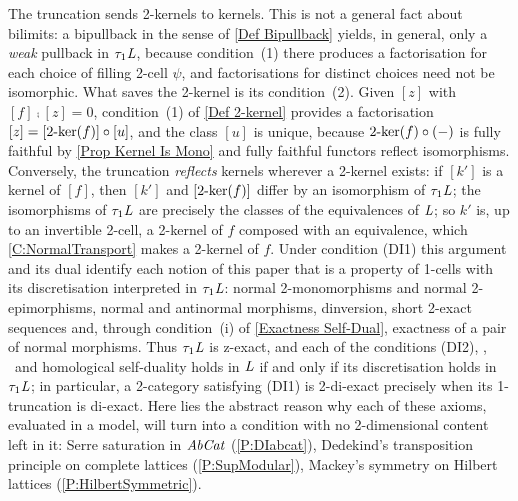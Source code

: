 \begin{remark}
	The truncation sends 2-kernels to kernels. This is not a general fact about bilimits: a bipullback in the sense of \ref{Def Bipullback} yields, in general, only a \emph{weak} pullback in \(\tau_{1}\mathit{L}\), because condition~(1) there produces a factorisation for each choice of filling 2-cell \(\psi\), and factorisations for distinct choices need not be isomorphic. What saves the 2-kernel is its condition~(2). Given \([z]\) with \([f]\comp[z]=0\), condition~(1) of \ref{Def 2-kernel} provides a factorisation \([z]=[2\text{-}\mathrm{ker}(f)]\circ[u]\), and the class \([u]\) is unique, because \(2\text{-}\mathrm{ker}(f)\circ(-)\) is fully faithful by \prox\ref{Prop Kernel Is Mono} and fully faithful functors reflect isomorphisms. Conversely, the truncation \emph{reflects} kernels wherever a 2-kernel exists: if \([k']\) is a kernel of \([f]\), then \([k']\) and \([2\text{-}\mathrm{ker}(f)]\) differ by an isomorphism of \(\tau_{1}\mathit{L}\); the isomorphisms of \(\tau_{1}\mathit{L}\) are precisely the classes of the equivalences of \(\mathit{L}\); so \(k'\) is, up to an invertible 2-cell, a 2-kernel of \(f\) composed with an equivalence, which \corx\ref{C:NormalTransport} makes a 2-kernel of \(f\). Under condition \textup{(DI1)} this argument and its dual identify each notion of this paper that is a property of 1-cells with its discretisation interpreted in \(\tau_{1}\mathit{L}\): normal 2-monomorphisms and normal 2-epimorphisms, normal and antinormal morphisms, dinversion, short 2-exact sequences and, through condition~(i) of \prox\ref{Exactness Self-Dual}, exactness of a pair of normal morphisms. Thus \(\tau_{1}\mathit{L}\) is z-exact, and each of the conditions \textup{(DI2)}, \DPN, \NEC\ and homological self-duality holds in \(\mathit{L}\) if and only if its discretisation holds in \(\tau_{1}\mathit{L}\); in particular, a 2-category satisfying \textup{(DI1)} is 2-di-exact precisely when its 1-truncation is di-exact. Here lies the abstract reason why each of these axioms, evaluated in a model, will turn into a condition with no 2-dimensional content left in it: Serre saturation in \(\mathit{AbCat}\) (\prox\ref{P:DIabcat}), Dedekind's transposition principle on complete lattices (\prox\ref{P:SupModular}), Mackey's symmetry on Hilbert lattices (\prox\ref{P:HilbertSymmetric}).


\end{remark}

